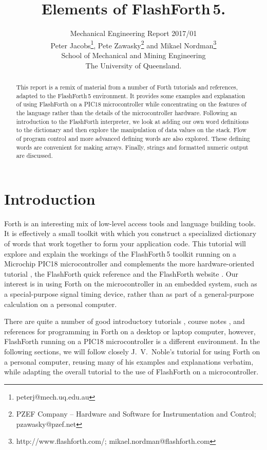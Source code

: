 \documentclass[12pt,a4paper]{article}
\title{
    Elements of FlashForth\,5.
}
\author{
    Mechanical Engineering Report 2017/01\\
    Peter Jacobs\thanks{peterj@mech.uq.edu.au}, 
    Pete Zawasky\thanks{PZEF Company -- Hardware and Software for Instrumentation and Control; pzawasky@pzef.net} and 
    Mikael Nordman\thanks{http://www.flashforth.com/; mikael.nordman@flashforth.com}\\
    School of Mechanical and Mining Engineering\\
    The University of Queensland.
}
\begin{document}
\maketitle

\begin{abstract}
This report is a remix of material from a number of Forth tutorials and references, 
adapted to the FlashForth\,5 environment.
It provides some examples and explanation of using FlashForth on a PIC18 microcontroller
while concentrating on the features of the language rather than the details of the
microcontroller hardware.
Following an introduction to the FlashForth interpreter, 
we look at adding our own word definitions to the dictionary and then explore
the manipulation of data values on the stack.
Flow of program control and more advanced defining words are also explored.
These defining words are convenient for making arrays.
Finally, strings and formatted numeric output are discussed.
\end{abstract}

\newpage
\tableofcontents

\cleardoublepage
\section{Introduction}
\label{sec:introduction}
%
Forth is an interesting mix of low-level access tools and language building tools.
It is effectively a small toolkit with which you construct a specialized dictionary of words
that work together to form your application code.
This tutorial will explore and explain the workings of the FlashForth\,5 toolkit
running on a Microchip PIC18 microcontroller
and complements the more hardware-oriented tutorial \cite{jacobs_2016a},
the FlashForth quick reference \cite{jacobs_2016b} and
the FlashForth website \cite{flashforth5}.
Our interest is in using Forth on the microcontroller in an embedded system,
such as a special-purpose signal timing device,
rather than as part of a general-purpose calculation on a personal computer.

\medskip
There are quite a number of good introductory tutorials \cite{brodie_1987a,noble_2001a}, 
course notes \cite{pelc_2011a},
and references \cite{conklin_rather_2007a} 
for programming in Forth on a desktop or laptop computer,
however, FlashForth running on a PIC18 microcontroller is a different environment.
In the following sections, we will follow closely J.~V.~Noble's tutorial \cite{noble_2001a}
for using Forth on a personal computer,
reusing many of his examples and explanations verbatim, 
while adapting the overall tutorial to the use of FlashForth on a microcontroller.
\end{document}
